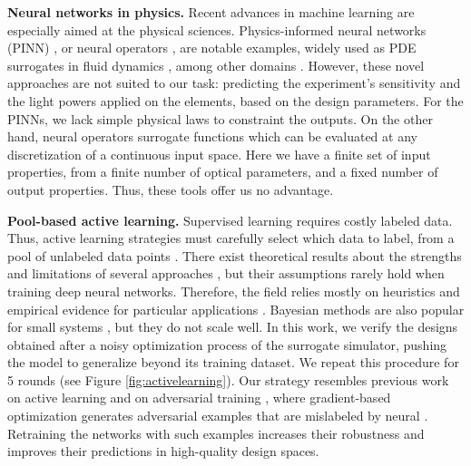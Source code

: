\documentclass[a4paper,twocolumn,11pt,unpublished]{quantumarticle}
\begin{document}
\textbf{Neural networks in physics.} Recent advances in machine learning are especially aimed at the physical sciences. Physics-informed neural networks (PINN) \cite{raissi2019physics, karniadakis2021piml}, or neural operators \cite{lu2021deeponet,azizzadenesheli2024neural}, are notable examples, widely used as PDE surrogates in fluid dynamics  \cite{mahmoudabadbozchelou2022nn,alkin2024universal}, among other domains \cite{oommen2024materials, cranganore2025einsteinfields}. However, these novel approaches are not suited to our task: predicting the experiment's sensitivity and the light powers applied on the elements, based on the design parameters. For the PINNs, we lack simple physical laws to constraint the outputs. On the other hand, neural operators surrogate functions which can be evaluated at any discretization of a continuous input space. Here we have a finite set of input properties, from a finite number of optical parameters, and a fixed number of output properties. Thus, these tools offer us no advantage.

\textbf{Pool-based active learning.} Supervised learning requires costly labeled data. Thus, active learning strategies must carefully select which data to label, from a pool of unlabeled data points \cite{active2009}. There exist theoretical results about the strengths and limitations of several approaches \cite{dasgupta2004greedy, hanneke2008bound, ganti2012upal, gonen2013efficient}, but their assumptions rarely hold when training deep neural networks. Therefore, the field relies mostly on heuristics and empirical evidence for particular applications \cite{ross2011reduction, lakshminarayanan2017simple, wang2017cost, sener2018active}. Bayesian methods are also popular for small systems \cite{roy2001toward, kapoor2007active, gal2016dropout,gal2017deepbayes}, but they do not scale well. In this work, we verify the designs obtained after a noisy optimization process of the surrogate simulator, pushing the model to generalize beyond its training dataset. We repeat this procedure for 5 rounds (see Figure \ref{fig:activelearning}). Our strategy resembles previous work on active learning \cite{pestourie2020active, singh2025active} and on adversarial training \cite{goodfellow2014explaining}, where gradient-based optimization generates adversarial examples that are mislabeled by neural  \cite{kurakin2017adversarial,madry2018towards}. Retraining the networks with such examples increases their robustness and improves their predictions in high-quality design spaces. %
\end{document}
